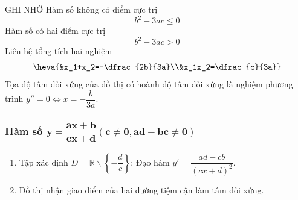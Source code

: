 	\begin{minipage}[b]{6.5cm}
		\begin{khung4}{GHI NHỚ}
			 Hàm số không có điểm cực trị
			$$b^2-3ac\le 0$$
			 Hàm số có hai điểm cực trị
			$$b^2-3ac >0$$
			 Liên hệ tổng tích hai nghiệm
			$$\heva{&x_1+x_2=-\dfrac{2b}{3a}\\&x_1x_2=\dfrac{c}{3a}}$$
			 Tọa độ tâm đối xứng của đồ thị có hoành độ tâm đối xứng là nghiệm phương trình $y''=0 \Leftrightarrow x=-\dfrac{b}{3a}$.
		\end{khung4}
		\vspace{1 cm}
	\end{minipage}
	\vspace{-1 cm}
\subsubsection{Hàm số $\mathbf{y = \dfrac{{ax + b}}{{cx + d}}\left( {c \ne 0,ad - bc \ne 0} \right)}$}
\begin{enumerate}[\iconCH]
	\item Tập xác định $D=\mathbb{R}\backslash \left\{-\dfrac{d}{c}\right\}$; Đạo hàm $y'=\dfrac{ad-cb}{(cx+d)^2}$.
	\item Đồ thị nhận giao điểm của hai đường tiệm cận làm tâm đối xứng.
\end{enumerate}
